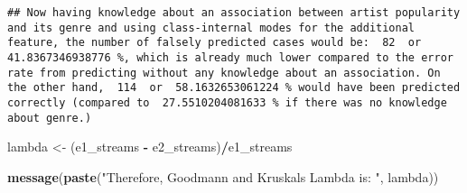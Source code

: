 \documentclass[
]{article}
\newenvironment{Shaded}{\begin{snugshade}}{\end{snugshade}}
\newcommand{\DecValTok}[1]{\textcolor[rgb]{0.00,0.00,0.81}{#1}}
\newcommand{\KeywordTok}[1]{\textcolor[rgb]{0.13,0.29,0.53}{\textbf{#1}}}
\newcommand{\NormalTok}[1]{#1}
\newcommand{\OperatorTok}[1]{\textcolor[rgb]{0.81,0.36,0.00}{\textbf{#1}}}
\newcommand{\StringTok}[1]{\textcolor[rgb]{0.31,0.60,0.02}{#1}}
\begin{document}
\begin{Shaded}
\end{Shaded}

\begin{verbatim}
## Now having knowledge about an association between artist popularity and its genre and using class-internal modes for the additional feature, the number of falsely predicted cases would be:  82  or  41.8367346938776 %, which is already much lower compared to the error rate from predicting without any knowledge about an association. On the other hand,  114  or  58.1632653061224 % would have been predicted correctly (compared to  27.5510204081633 % if there was no knowledge about genre.)
\end{verbatim}

\begin{Shaded}
\begin{Highlighting}[]
\NormalTok{lambda <-}\StringTok{ }\NormalTok{(e1_streams }\OperatorTok{-}\StringTok{ }\NormalTok{e2_streams)}\OperatorTok{/}\NormalTok{e1_streams}

\KeywordTok{message}\NormalTok{(}\KeywordTok{paste}\NormalTok{(}\StringTok{"Therefore, Goodmann and Kruskals Lambda is: "}\NormalTok{, lambda))}
\end{Highlighting}
\end{Shaded}
\end{document}
